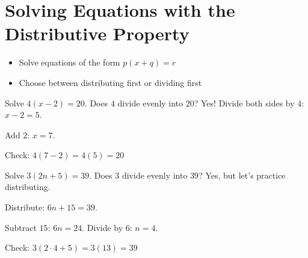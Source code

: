 \section{Solving Equations with the Distributive Property}

\begin{stepGoal}
\begin{itemize}
    \item Solve equations of the form $p(x + q) = r$
    \item Choose between distributing first or dividing first
\end{itemize}
\end{stepGoal}

\begin{stepVocabBox}
\end{stepVocabBox}

\begin{stepsCard}
\end{stepsCard}

\begin{stepExample}{Solve $4(x - 2) = 20$.}
     Does $4$ divide evenly into $20$? Yes! Divide both sides by $4$: $x - 2 = 5$.

     Add $2$: $x = 7$.

     Check: $4(7 - 2) = 4(5) = 20$ \checkmark
\end{stepExample}

\begin{stepExample}{Solve $3(2n + 5) = 39$.}
     Does $3$ divide evenly into $39$? Yes, but let's practice distributing.

     Distribute: $6n + 15 = 39$.

     Subtract $15$: $6n = 24$. Divide by $6$: $n = 4$.

     Check: $3(2 \cdot 4 + 5) = 3(13) = 39$ \checkmark
\end{stepExample}

